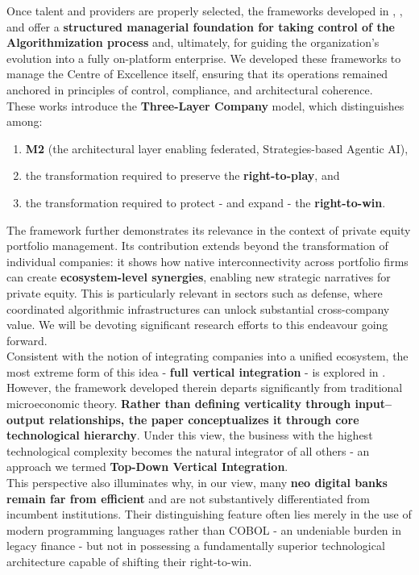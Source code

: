 \documentclass{article}
\begin{document}
Once talent and providers are properly selected, the frameworks developed in \cite{3layer}, \cite{OTAN}, and \cite{Revista Infra} offer a \textbf{structured managerial foundation for taking control of the Algorithmization process} and, ultimately, for guiding the organization’s evolution into a fully on-platform enterprise. We developed these frameworks to manage the Centre of Excellence itself, ensuring that its operations remained anchored in principles of control, compliance, and architectural coherence.\\

These works introduce the \textbf{Three-Layer Company} model, which distinguishes among:
\begin{enumerate}
    \item \textbf{M2} (the architectural layer enabling federated, Strategies-based Agentic AI),
    \item the transformation required to preserve the \textbf{right-to-play}, and
    \item the transformation required to protect - and expand - the \textbf{right-to-win}.
\end{enumerate}

The framework further demonstrates its relevance in the context of private equity portfolio management. Its contribution extends beyond the transformation of individual companies: it shows how native interconnectivity across portfolio firms can create \textbf{ecosystem-level synergies}, enabling new strategic narratives for private equity. This is particularly relevant in sectors such as defense, where coordinated algorithmic infrastructures can unlock substantial cross-company value. We will be devoting significant research efforts to this endeavour going forward.\\

Consistent with the notion of integrating companies into a unified ecosystem, the most extreme form of this idea - \textbf{full vertical integration} - is explored in \cite{Vertical Integration}. However, the framework developed therein departs significantly from traditional microeconomic theory. \textbf{Rather than defining verticality through input–output relationships, the paper conceptualizes it through core technological hierarchy}. Under this view, the business with the highest technological complexity becomes the natural integrator of all others - an approach we termed \textbf{Top-Down Vertical Integration}.\\

This perspective also illuminates why, in our view, many \textbf{neo digital banks remain far from efficient} and are not substantively differentiated from incumbent institutions. Their distinguishing feature often lies merely in the use of modern programming languages rather than COBOL - an undeniable burden in legacy finance - but not in possessing a fundamentally superior technological architecture capable of shifting their right-to-win.\\
\end{document}
